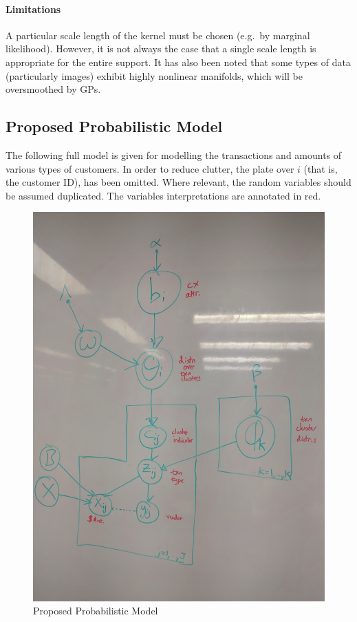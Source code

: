 \documentclass[]{article}
\begin{document}
\paragraph{Limitations}\label{limitations}

A particular scale length of the kernel must be chosen (e.g.~by marginal
likelihood). However, it is not always the case that a single scale
length is appropriate for the entire support. It has also been noted
that some types of data (particularly images) exhibit highly nonlinear
manifolds, which will be oversmoothed by GPs.

\subsection{Proposed Probabilistic
Model}\label{proposed-probabilistic-model}

The following full model is given for modelling the transactions and
amounts of various types of customers. In order to reduce clutter, the
plate over \(i\) (that is, the customer ID), has been omitted. Where
relevant, the random variables should be assumed duplicated. The
variables interpretations are annotated in red.

\begin{figure}
    \centering
    \includegraphics[height=0.8\textheight]{uploads/upload_37fb8c8385fe1a4fc0231ccb4dee1d28.jpg}
    \caption{Proposed Probabilistic Model}
    \label{fig:proposed_model_sketch}
\end{figure}
\end{document}
